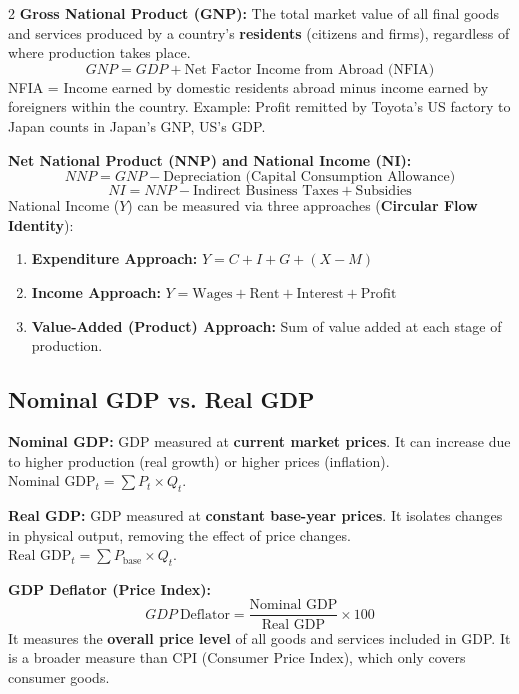 \documentclass[10pt,a4paper]{article}
\begin{document}
\begin{multicols}{2}
\textbf{Gross National Product (GNP):} The total market value of all final goods and services produced by a country's \textbf{residents} (citizens and firms), regardless of where production takes place.
\[
GNP = GDP + \text{Net Factor Income from Abroad (NFIA)}
\]
NFIA = Income earned by domestic residents abroad minus income earned by foreigners within the country. Example: Profit remitted by Toyota's US factory to Japan counts in Japan's GNP, US's GDP.

\textbf{Net National Product (NNP) and National Income (NI):}
\[
NNP = GNP - \text{Depreciation (Capital Consumption Allowance)}
\]
\[
NI = NNP - \text{Indirect Business Taxes} + \text{Subsidies}
\]
National Income ($Y$) can be measured via three approaches (\textbf{Circular Flow Identity}):
\begin{enumerate}[leftmargin=*,nosep]
    \item \textbf{Expenditure Approach:} $Y = C + I + G + (X - M)$
    \item \textbf{Income Approach:} $Y = \text{Wages} + \text{Rent} + \text{Interest} + \text{Profit}$
    \item \textbf{Value-Added (Product) Approach:} Sum of value added at each stage of production.
\end{enumerate}

\subsection*{Nominal GDP vs. Real GDP}
\textbf{Nominal GDP:} GDP measured at \textbf{current market prices}. It can increase due to higher production (real growth) or higher prices (inflation). $\text{Nominal GDP}_t = \sum P_t \times Q_t$.

\textbf{Real GDP:} GDP measured at \textbf{constant base-year prices}. It isolates changes in physical output, removing the effect of price changes. $\text{Real GDP}_t = \sum P_{\text{base}} \times Q_t$.

\textbf{GDP Deflator (Price Index):}
\[
GDP\ \text{Deflator} = \frac{\text{Nominal GDP}}{\text{Real GDP}} \times 100
\]
It measures the \textbf{overall price level} of all goods and services included in GDP. It is a broader measure than CPI (Consumer Price Index), which only covers consumer goods.


\end{multicols}
\end{document}
